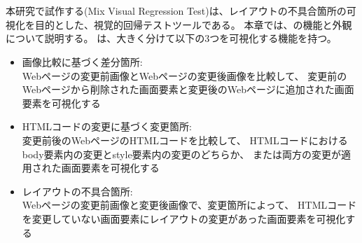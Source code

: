 \chapter{ \toolName}\label{cha:Function}
本研究で試作する\toolName (Mix Visual Regression Test)は、レイアウトの不具合箇所の可視化を目的とした、視覚的回帰テストツールである。
本章では、\toolName の機能と外観について説明する。
\toolName は、大きく分けて以下の3つを可視化する機能を持つ。
\begin{itemize}
      \item 画像比較に基づく差分箇所:\\
            Webページの変更前画像とWebページの変更後画像を比較して、
            変更前のWebページから削除された画面要素と変更後のWebページに追加された画面要素を可視化する
      \item HTMLコードの変更に基づく変更箇所:\\
            変更前後のWebページのHTMLコードを比較して、
            HTMLコードにおけるbody要素内の変更とstyle要素内の変更のどちらか、
            または両方の変更が適用された画面要素を可視化する
      \item レイアウトの不具合箇所:\\
            Webページの変更前画像と変更後画像で、変更箇所によって、
            HTMLコードを変更していない画面要素にレイアウトの変更があった画面要素を可視化する
\end{itemize}
